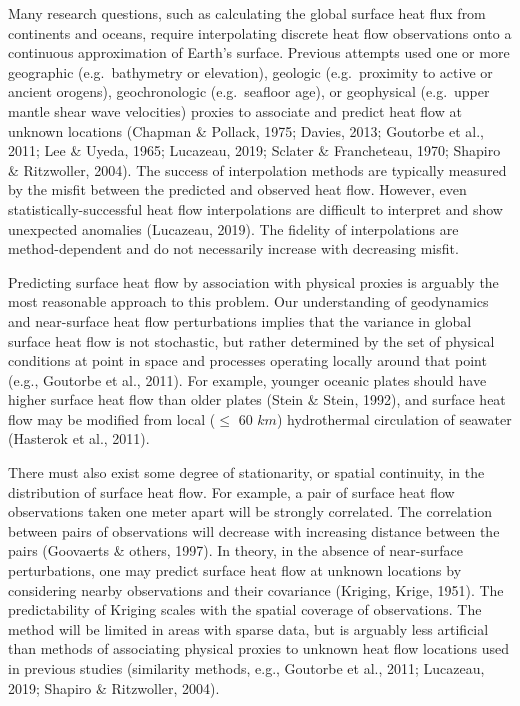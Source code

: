 \documentclass[draft,linenumbers]{agujournal2018}
\begin{document}
Many research questions, such as calculating the global surface heat
flux from continents and oceans, require interpolating discrete heat
flow observations onto a continuous approximation of Earth's surface.
Previous attempts used one or more geographic (e.g.~bathymetry or
elevation), geologic (e.g.~proximity to active or ancient orogens),
geochronologic (e.g.~seafloor age), or geophysical (e.g.~upper mantle
shear wave velocities) proxies to associate and predict heat flow at
unknown locations (Chapman \& Pollack, 1975; Davies, 2013; Goutorbe et
al., 2011; Lee \& Uyeda, 1965; Lucazeau, 2019; Sclater \& Francheteau,
1970; Shapiro \& Ritzwoller, 2004). The success of interpolation methods
are typically measured by the misfit between the predicted and observed
heat flow. However, even statistically-successful heat flow
interpolations are difficult to interpret and show unexpected anomalies
(Lucazeau, 2019). The fidelity of interpolations are method-dependent
and do not necessarily increase with decreasing misfit.

Predicting surface heat flow by association with physical proxies is
arguably the most reasonable approach to this problem. Our understanding
of geodynamics and near-surface heat flow perturbations implies that the
variance in global surface heat flow is not stochastic, but rather
determined by the set of physical conditions at point in space and
processes operating locally around that point (e.g., Goutorbe et al.,
2011). For example, younger oceanic plates should have higher surface
heat flow than older plates (Stein \& Stein, 1992), and surface heat
flow may be modified from local (\(\leq\) 60 \(km\)) hydrothermal
circulation of seawater (Hasterok et al., 2011).

There must also exist some degree of stationarity, or spatial
continuity, in the distribution of surface heat flow. For example, a
pair of surface heat flow observations taken one meter apart will be
strongly correlated. The correlation between pairs of observations will
decrease with increasing distance between the pairs (Goovaerts \&
others, 1997). In theory, in the absence of near-surface perturbations,
one may predict surface heat flow at unknown locations by considering
nearby observations and their covariance (Kriging, Krige, 1951). The
predictability of Kriging scales with the spatial coverage of
observations. The method will be limited in areas with sparse data, but
is arguably less artificial than methods of associating physical proxies
to unknown heat flow locations used in previous studies (similarity
methods, e.g., Goutorbe et al., 2011; Lucazeau, 2019; Shapiro \&
Ritzwoller, 2004).
\end{document}
